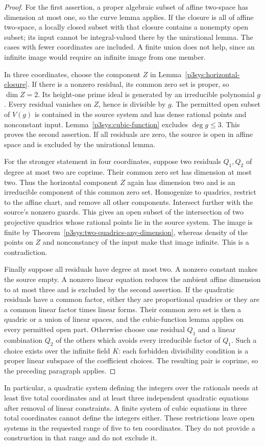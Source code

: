\begin{proof}
For the first assertion, a proper algebraic subset of affine
two-space has dimension at most one, so the curve lemma applies.
If the closure is all of affine two-space, a locally closed subset
with that closure contains a nonempty open subset; its input cannot
be integral-valued there by the unirational lemma.  The cases with
fewer coordinates are included.  A finite union does not help,
since an infinite image would require an infinite image from one
member.

In three coordinates, choose the component $Z$ in
Lemma~\ref{p3sys:horizontal-closure}.  If there is a nonzero
residual, its common zero set is proper, so $\dim Z=2$.  Its
height-one prime ideal is generated by an irreducible polynomial
$g$.  Every residual vanishes on $Z$, hence is divisible by $g$.
The permitted open subset of $V(g)$ is contained in the source
system and has dense rational points and nonconstant input.
Lemma~\ref{p3sys:cubic-function} excludes $\deg g\le3$.
This proves the second assertion.  If all residuals are zero,
the source is open in affine space and is excluded by the
unirational lemma.

For the stronger statement in four coordinates, suppose two
residuals $Q_1,Q_2$ of degree at most two are coprime.  Their
common zero set has dimension at most two.  Thus the horizontal
component $Z$ again has dimension two and is an irreducible
component of this common zero set.  Homogenize to quadrics,
restrict to the affine chart, and remove all other components.
Intersect further with the source's nonzero guards.  This gives
an open subset of the intersection of two projective quadrics
whose rational points lie in the source system.  The image is
finite by Theorem~\ref{p3sys:two-quadrics-any-dimension}, whereas
density of the points on $Z$ and nonconstancy of the input make
that image infinite.  This is a contradiction.

Finally suppose all residuals have degree at most two.  A nonzero
constant makes the source empty.  A nonzero linear equation reduces
the ambient affine dimension to at most three and is excluded by
the second assertion.  If the quadratic residuals have a common
factor, either they are proportional quadrics or they are a common
linear factor times linear forms.  Their common zero set is then
a quadric or a union of linear spaces, and the cubic-function
lemma applies on every permitted open part.  Otherwise choose
one residual $Q_1$ and a linear combination $Q_2$ of the others
which avoids every irreducible factor of $Q_1$.  Such a choice
exists over the infinite field $K$: each forbidden divisibility
condition is a proper linear subspace of the coefficient choices.
The resulting pair is coprime, so the preceding paragraph applies.
\end{proof}

In particular, a quadratic system defining the integers over the
rationals needs at least five total coordinates and at least three
independent quadratic equations after removal of linear constraints.
A finite system of cubic equations in three total coordinates cannot
define the integers either.  These restrictions leave open systems in
the requested range of five to ten coordinates.  They do not provide
a construction in that range and do not exclude it.
